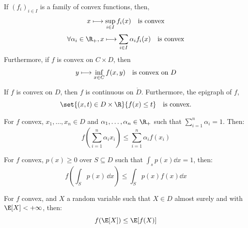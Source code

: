 \documentclass{../cs-classes/cs-classes}
\begin{document}
\begin{property}
    If $(f_i)_{i\in I}$ is a family of convex functions, then,
    \begin{equation*}
        x \longmapsto \sup_{i\in I} f_i(x) \quad\textnormal{is convex}
    \end{equation*}
    \begin{equation*}
        \forall \alpha_i\in\R_+, x \longmapsto \sum_{i\in I} \alpha_i f_i(x) \quad\textnormal{is convex}
    \end{equation*}
    Furthermore, if $f$ is convex on $C\times D$, then
    \begin{equation*}
        y \longmapsto \inf_{x\in C} f(x, y) \quad \textnormal{is convex on $D$}
    \end{equation*}
\end{property}

\begin{property}
    If $f$ is convex on $D$, then $f$ is continuous on $\mathring{D}$. Furthermore, the epigraph of $f$,
    \begin{equation*}
        \set{(x, t)\in D\times\R}{f(x)\leq t} \quad \textnormal{is convex.}
    \end{equation*}
\end{property}

\begin{property}
    For $f$ convex, $x_1, \dots, x_n\in D$ and $\alpha_1,\dots, \alpha_n\in\R_+$ such that $\sum_{i=1}^n\alpha_i=1$. Then:
    \begin{equation*}
        f\left(\sum_{i=1}^n\alpha_ix_i\right) \leq \sum_{i=1}^n\alpha_if(x_i)
    \end{equation*}
\end{property}

\begin{property}
    For $f$ convex, $p(x)\geq0$ over $S\subseteq D$ such that $\int_s p(x)\dd x=1$, then:
    \begin{equation*}
        f\left(\int_Sp(x)\,\dd x\right) \leq \int_Sp(x)f(x)\dd x
    \end{equation*}
\end{property}

\begin{property}
    For $f$ convex, and $X$ a random variable such that $X\in D$ almost surely and with $\E[X]<+\infty$, then:
    \begin{equation*}
        f(\E[X])\leq\E[f(X)]
    \end{equation*}
\end{property}
\end{document}

